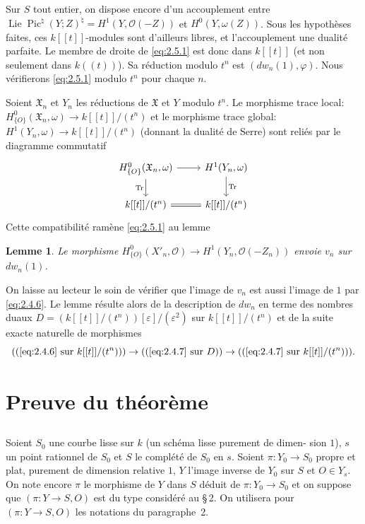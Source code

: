 \documentclass[12pt,a4paper]{article}
\theoremstyle{plain}
\newtheorem{lemma}{Lemme}
\theoremstyle{definition}
\theoremstyle{remark}
\DeclareMathOperator{\Lie}{Lie}
\DeclareMathOperator{\Pic}{Pic}
\DeclareMathOperator{\Tr}{Tr}
\newcommand{\OO}{\mathcal{O}}
\providecommand{\Lie}{\operatorname{Lie}}
\providecommand{\Tr}{\operatorname{Tr}}
\begin{document}
Sur $S$ tout entier, on dispose encore d'un accouplement entre
$\Lie\Pic^\natural(Y;Z)^\natural=H^1(Y,\OO(-Z))$ et $H^0(Y,\omega(Z))$. Sous les hypothèses
faites, ces $k[[t]]$-modules sont d'ailleurs libres, et l'accouplement une dualité parfaite.
Le membre de droite de \eqref{eq:2.5.1} est donc dans $k[[t]]$ (et non seulement dans
$k((t))$). Sa réduction modulo $t^n$ est $(dw_n(1),\varphi)$. Nous vérifierons
\eqref{eq:2.5.1} modulo $t^n$ pour chaque $n$.

Soient $\mathfrak{X}_n$ et $Y_n$ les réductions de $\mathfrak{X}$ et $Y$ modulo $t^n$. Le morphisme trace
local: $H^0_{\{O\}}(\mathfrak{X}_n,\omega)\to k[[t]]/(t^n)$ et le morphisme trace global:
$H^1(Y_n,\omega)\to k[[t]]/(t^n)$ (donnant la dualité de Serre) sont reliés par le
diagramme commutatif
\[
\begin{tikzcd}
H^0_{\{O\}}(\mathfrak{X}_n,\omega) \ar[r] \ar[d,"\Tr"'] & H^1(Y_n,\omega) \ar[d,"\Tr"] \\
k[[t]]/(t^n) \ar[r,equal] & k[[t]]/(t^n)
\end{tikzcd}
\]
Cette compatibilité ramène \eqref{eq:2.5.1} au lemme

\begin{lemma}\label{lem:2.6}
Le morphisme $H^0_{\{O\}}(X'_n,\OO)\to H^1(Y_n,\OO(-Z_n))$
envoie $v_n$ sur $dw_n(1)$.
\end{lemma}

On laisse au lecteur le soin de vérifier que l'image de $v_n$ est aussi l'image de
$1$ par \eqref{eq:2.4.6}. Le lemme résulte alors de la description de $dw_n$ en terme des
nombres duaux $D=(k[[t]]/(t^n))[\varepsilon]/(\varepsilon^2)$ sur $k[[t]]/(t^n)$ et de la suite exacte naturelle
de morphismes
\[
((\eqref{eq:2.4.6}\text{ sur }k[[t]]/(t^n)))\to((\eqref{eq:2.4.7}\text{ sur }D))\to((\eqref{eq:2.4.7}\text{ sur }k[[t]]/(t^n))).
\]

\section{Preuve du théorème}

\subsection{}\label{sec:3.1}

Soient $S_0$ une courbe lisse sur $k$ (un schéma lisse purement de dimen-
sion $1$), $s$ un point rationnel de $S_0$ et $S$ le complété de $S_0$ en $s$. Soient
$\pi:Y_0\to S_0$ propre et plat, purement de dimension relative $1$, $Y$ l'image inverse
de $Y_0$ sur $S$ et $O\in Y_s$. On note encore $\pi$ le morphisme de $Y$ dans $S$ déduit de
$\pi:Y_0\to S_0$ et on suppose que $(\pi:Y\to S,O)$ est du type considéré au \S\,2.
On utilisera pour $(\pi:Y\to S,O)$ les notations du paragraphe~2.
\end{document}
